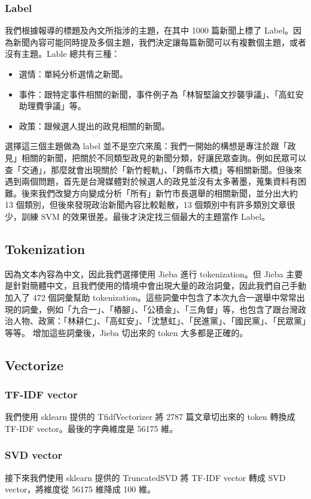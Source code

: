 \documentclass[12pt,cleanfoot,twocolumn]{asme2ej}
\begin{document}
\subsubsection{Label}
我們根據報導的標題及內文所指涉的主題，在其中 1000 篇新聞上標了 Label。因為新聞內容可能同時提及多個主題，我們決定讓每篇新聞可以有複數個主題，或者沒有主題。Lable 總共有三種：
\begin{itemize}
        \item 選情：單純分析選情之新聞。
        \item 事件：跟特定事件相關的新聞，事件例子為「林智堅論文抄襲爭議」、「高虹安助理費爭議」等。
        \item 政策：跟候選人提出的政見相關的新聞。
\end{itemize}
選擇這三個主題做為 label 並不是空穴來風：我們一開始的構想是專注於跟「政見」相關的新聞，把關於不同類型政見的新聞分類，好讓民眾查詢。例如民眾可以查「交通」，那麼就會出現關於「新竹輕軌」、「跨縣市大橋」等相關新聞。但後來遇到兩個問題，首先是台灣媒體對於候選人的政見並沒有太多著墨，蒐集資料有困難。後來我們改變方向變成分析「所有」新竹市長選舉的相關新聞，並分出大約 13 個類別，但後來發現政治新聞內容比較鬆散，13 個類別中有許多類別文章很少，訓練 SVM 的效果很差。最後才決定找三個最大的主題當作 Label。

\subsection{Tokenization}
因為文本內容為中文，因此我們選擇使用 Jieba 進行 tokenization。但 Jieba 主要是針對簡體中文，且我們使用的情境中會出現大量的政治詞彙，因此我們自己手動加入了 472 個詞彙幫助 tokenization。這些詞彙中包含了本次九合一選舉中常常出現的詞彙，例如「九合一」、「樁腳」、「公積金」、「三角督」等，也包含了跟台灣政治人物、政黨：「林耕仁」、「高虹安」、「沈慧虹」、「民進黨」、「國民黨」、「民眾黨」等等。
增加這些詞彙後，Jieba 切出來的 token 大多都是正確的。

\subsection{Vectorize}
\subsubsection{TF-IDF vector}
我們使用 sklearn 提供的 TfidfVectorizer 將 2787 篇文章切出來的 token 轉換成 TF-IDF vector。最後的字典維度是 56175 維。

\subsubsection{SVD vector}
接下來我們使用 sklearn 提供的 TruncatedSVD 將 TF-IDF vector 轉成 SVD vector，將維度從 56175 維降成 100 維。
\end{document}
